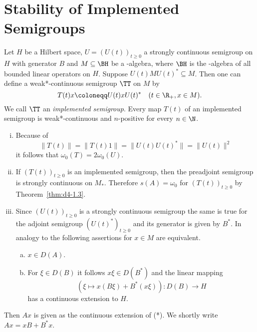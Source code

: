 \section{Stability of Implemented Semigroups}
Let $H$ be a Hilbert space, $U = (U(t))_{t \geq 0}$ a strongly continuous semigroup on $H$ with generator $B$ and $M \subseteq \BH$ be a \WA-algebra, where $\BH$ is the \WA-algebra of all bounded linear operators on $H$.
Suppose $U(t)MU(t)^{*} \subseteq M$.
Then one can define a weak*-continuous semigroup $\TT$ on $M$ by 
%
\[
	T(t)x \coloneqq U(t)xU(t)^{*} \quad (t \in \R_{+}, x \in M) .
\]
%
We call $\TT$ an \emph{implemented semigroup}.
Every map $T(t)$ of an implemented semigroup is weak*-continuous and $n$-positive for every $n \in \N$.
\begin{remarks}\label{rem:d4-2.1}
\begin{enumerate}[(i), wide]
\item\label{item:d4-2.1-i}
Because of
\[
\|T(t)\| = \|T(t)1\| = \|U(t)U(t)^{*}\| = \|U(t)\|^2
\]
it follows that $\omega_{0}(T) = 2\omega_{0}(U)$.

\item\label{item:d4-2.1-ii}
If $(T(t))_{t \geq 0}$ is an implemented semigroup, then the preadjoint semigroup is strongly continuous on $M_{*}$.
Therefore $s(A) = \omega_{0}$ for $(T(t))_{t \geq 0}$ by Theorem~\ref{thm:d4-1.3}.

\item\label{item:d4-2.1-iii}
Since $(U(t))_{t \geq 0}$ is a strongly continuous semigroup the same is true for the adjoint semigroup $(U(t)^{*})_{t \geq 0}$ and its generator is given by $B^{*}$.
In analogy to \citet[3.2.55]{brattelirobinson:1979} the following assertions for $x \in M$ are equivalent.
\begin{enumerate}[(a)]
\item
$x \in D(A)$.

\item
For $\xi \in D(B)$ it follows $x\xi \in D(B^{*})$ and the linear mapping
\begin{equation}
	(\xi \mapsto x(B\xi)+B^{*}(x\xi)): D(B) \to H \tag{*}
\end{equation}
has a continuous extension to $H$.
\end{enumerate}
\end{enumerate}
\end{remarks}
Then $Ax$ is given as the continuous extension of (*).
We shortly write $Ax = xB + B^{*}x$.

